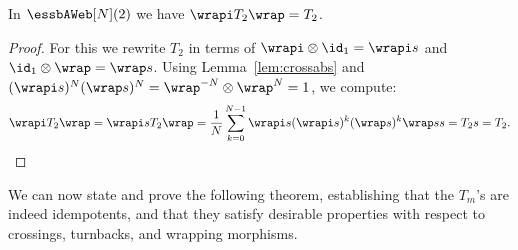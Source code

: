 \begin{lemma} In $\essbAWeb[N](2)$ we have $\wrapi T_2 \wrap=T_2$.
\end{lemma}
\begin{proof} 
For this we rewrite $T_2$ in terms of $\wrapi\otimes \id_1= \wrapi s$ and $\id_1 \otimes \wrap= \wrap s$. Using Lemma~\ref{lem:crossabs} and $(\wrapi s)^N (\wrap s)^N = \wrap^{-N}\otimes \wrap^N= 1$, we compute:
\[\wrapi T_2 \wrap= \wrapi s T_2 \wrap= \frac{1}{N}\sum_{k=0}^{N-1} \wrapi s ( \wrapi s)^{k}(\wrap s)^k\wrap s s=T_2 s= T_2. \qedhere\]
\end{proof}

We can now state and prove the following theorem, establishing that the $T_m$'s
are indeed idempotents, and that they satisfy desirable properties with respect
to crossings, turnbacks, and wrapping morphisms.

